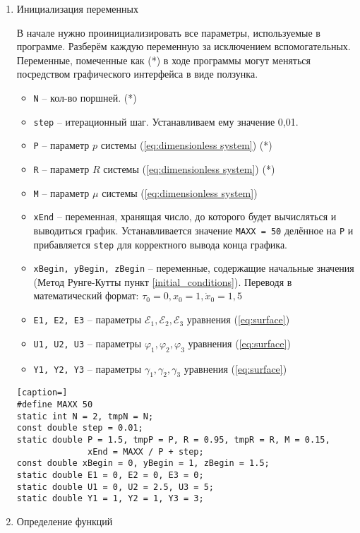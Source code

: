 \begin{enumerate}
\item \label{VarInitialization}Инициализация переменных

В начале нужно проинициализировать все параметры, используемые в программе. Разберём каждую переменную за исключением вспомогательных. Переменные, помеченные как (*) в ходе программы могут меняться посредством графического интерфейса в виде ползунка.

\begin{itemize}
\item \texttt{N} -- кол-во поршней. (*)
\item \texttt{step} -- итерационный шаг. Устанавливаем ему значение 0,01.
\item \texttt{P} -- параметр $p$ системы (\ref{eq:dimensionless system}) (*)
\item \texttt{R} -- параметр $R$ системы (\ref{eq:dimensionless system}) (*)
\item \texttt{M} -- параметр $\mu$ системы (\ref{eq:dimensionless system})
\item \texttt{xEnd} -- переменная, хранящая число, до которого будет вычисляться и выводиться график. Устанавливается значение \texttt{MAXX = 50} делённое на \texttt{P} и прибавляется \texttt{step} для корректного вывода конца графика.
\item \texttt{xBegin, yBegin, zBegin} -- переменные, содержащие начальные значения (Метод Рунге-Кутты пункт \ref{initial_conditions}). Переводя в математический формат: $\tau_0 = 0, x_0 = 1, \dot x_0 = 1,5$
\item \texttt{E1, E2, E3} -- параметры $\mathcal{E}_1, \mathcal{E}_2, \mathcal{E}_3$ уравнения (\ref{eq:surface})
\item \texttt{U1, U2, U3} -- параметры $\varphi_1, \varphi_2, \varphi_3$ уравнения (\ref{eq:surface})
\item \texttt{Y1, Y2, Y3} -- параметры $\gamma_1, \gamma_2, \gamma_3$ уравнения (\ref{eq:surface})
\end{itemize}

\begin{lstlisting}[caption=]
#define MAXX 50
static int N = 2, tmpN = N;
const double step = 0.01;
static double P = 1.5, tmpP = P, R = 0.95, tmpR = R, M = 0.15,
              xEnd = MAXX / P + step;
const double xBegin = 0, yBegin = 1, zBegin = 1.5;
static double E1 = 0, E2 = 0, E3 = 0;
static double U1 = 0, U2 = 2.5, U3 = 5;
static double Y1 = 1, Y2 = 1, Y3 = 3;
\end{lstlisting}
\newpage
\item Определение функций


\end{enumerate}
